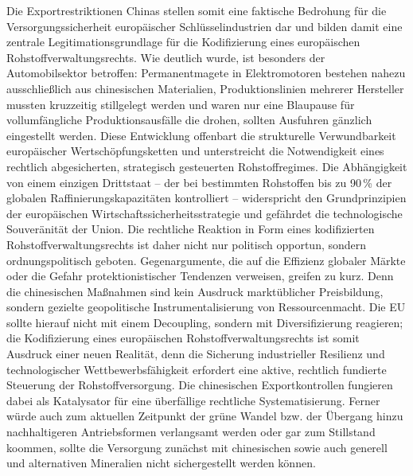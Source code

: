 \documentclass[12pt,a4paper,oneside]{book} %
\begin{document}
Die Exportrestriktionen Chinas stellen somit eine faktische Bedrohung für die Versorgungssicherheit europäischer Schlüsselindustrien dar und bilden damit eine zentrale Legitimationsgrundlage für die Kodifizierung eines europäischen Rohstoffverwaltungsrechts. Wie deutlich wurde, ist besonders der Automobilsektor betroffen: Permanentmagete in Elektromotoren bestehen nahezu ausschließlich aus chinesischen Materialien, Produktionslinien mehrerer Hersteller mussten kruzzeitig stillgelegt werden und waren nur eine Blaupause für vollumfängliche Produktionsausfälle die drohen, sollten Ausfuhren gänzlich eingestellt werden.
Diese Entwicklung offenbart die strukturelle Verwundbarkeit europäischer Wertschöpfungsketten und unterstreicht die Notwendigkeit eines rechtlich abgesicherten, strategisch gesteuerten Rohstoffregimes. Die Abhängigkeit von einem einzigen Drittstaat -- der bei bestimmten Rohstoffen bis zu 90 \% der globalen Raffinierungskapazitäten kontrolliert -- widerspricht den Grundprinzipien der europäischen Wirtschaftssicherheitsstrategie und gefährdet die technologische Souveränität der Union. Die rechtliche Reaktion in Form eines kodifizierten Rohstoffverwaltungsrechts ist daher nicht nur politisch opportun, sondern ordnungspolitisch geboten. Gegenargumente, die auf die Effizienz globaler Märkte oder die Gefahr protektionistischer Tendenzen verweisen, greifen zu kurz. Denn die chinesischen Maßnahmen sind kein Ausdruck marktüblicher Preisbildung, sondern gezielte geopolitische Instrumentalisierung von Ressourcenmacht. Die EU sollte hierauf nicht mit einem Decoupling, sondern mit Diversifizierung reagieren; die Kodifizierung eines europäischen Rohstoffverwaltungsrechts ist somit Ausdruck einer neuen Realität, denn die Sicherung industrieller Resilienz und technologischer Wettbewerbsfähigkeit erfordert eine aktive, rechtlich fundierte Steuerung der Rohstoffversorgung. Die chinesischen Exportkontrollen fungieren dabei als Katalysator für eine überfällige rechtliche Systematisierung. Ferner würde auch zum aktuellen Zeitpunkt der grüne Wandel bzw. der Übergang hinzu nachhaltigeren Antriebsformen verlangsamt werden oder gar zum Stillstand koommen, sollte die Versorgung zunächst mit chinesischen sowie auch generell und alternativen Mineralien nicht sichergestellt werden können.



\end{document}
